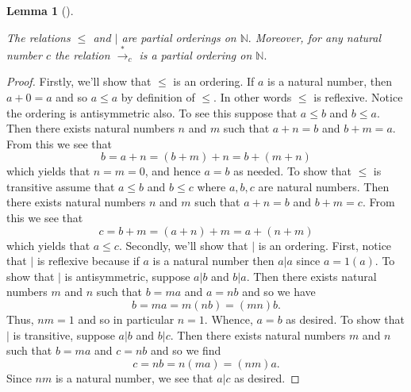 \documentclass[
  twoside,
  12pt,
  letterpaper]{article}
\theoremstyle{definition}
\theoremstyle{definition}
\theoremstyle{definition}
\theoremstyle{plain}
\newtheorem{lemma}{Lemma}[section]
\theoremstyle{plain}
\theoremstyle{remark}
\begin{document}
\begin{lemma}[]\protect\hypertarget{lem-partial-orderings-on-natural-numbers}{}\label{lem-partial-orderings-on-natural-numbers}

The relations \(\leq\) and \(\vert\) are partial orderings on
\(\mathbb{N}.\) Moreover, for any natural number \(c\) the relation
\(\overset{*}{\longrightarrow}_c\) is a partial ordering on
\(\mathbb{N}.\)

\end{lemma}

\begin{proof}

Firstly, we'll show that \(\leq\) is an ordering. If \(a\) is a natural
number, then \(a+0 = a\) and so \(a\leq a\) by definition of \(\leq\).
In other words \(\leq\) is reflexive. Notice the ordering is
antisymmetric also. To see this suppose that \(a\leq b\) and
\(b\leq a\). Then there exists natural numbers \(n\) and \(m\) such that
\(a+n = b\) and \(b+m = a\). From this we see that \begin{equation}
\label{additive-antisymmetric}
b=a+n=(b+m)+n=b+(m+n)
\end{equation} which yields that \(n=m=0\), and hence \(a=b\) as needed.
To show that \(\leq\) is transitive assume that \(a\leq b\) and
\(b\leq c\) where \(a,b,c\) are natural numbers. Then there exists
natural numbers \(n\) and \(m\) such that \(a+n = b\) and \(b+m = c\).
From this we see that \begin{equation}
\label{additive-transitive}
c=b+m=(a+n)+m=a+(n+m)
\end{equation} which yields that \(a\leq c\). Secondly, we'll show that
\(\vert\) is an ordering. First, notice that \(|\) is reflexive because
if \(a\) is a natural number then \(a|a\) since \(a=1(a)\). To show that
\(|\) is antisymmetric, suppose \(a|b\) and \(b|a\). Then there exists
natural numbers \(m\) and \(n\) such that \(b=m a\) and \(a=n b\) and so
we have \begin{equation}
\label{multiplicative-antisymmetric}
b=ma=m(nb)=(mn)b.
\end{equation} Thus, \(nm=1\) and so in particular \(n=1.\) Whence,
\(a=b\) as desired. To show that \(|\) is transitive, suppose \(a|b\)
and \(b|c.\) Then there exists natural numbers \(m\) and \(n\) such that
\(b=m a\) and \(c=nb\) and so we find \begin{equation}
\label{multiplicative-transitive}
c=nb=n(ma)=(nm)a.
\end{equation} Since \(nm\) is a natural number, we see that \(a|c\) as
desired.

\end{proof}
\end{document}
